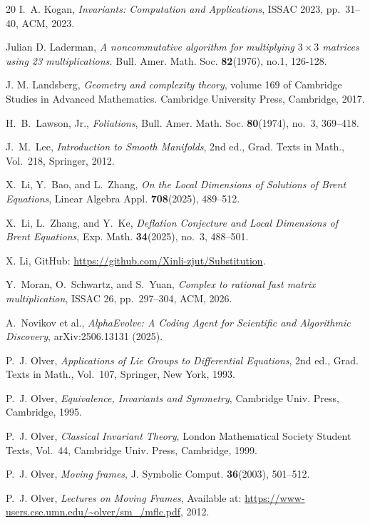 \documentclass[reqno]{amsart}
\theoremstyle{definition}
\numberwithin{equation}{section}
\theoremstyle{remark}
\begin{document}
\begin{thebibliography}{20}
I.~A. Kogan, \emph{Invariants: Computation and Applications}, ISSAC 2023, pp.~31--40, ACM, 2023.


Julian D. Laderman,
\emph{A noncommutative algorithm for multiplying $3\times3$ matrices using 23 multiplications.} Bull. Amer. Math. Soc. \textbf{82}(1976), no.1, 126-128.

J. M. Landsberg, \emph{Geometry and complexity theory}, volume 169 of Cambridge Studies in Advanced Mathematics. Cambridge University Press, Cambridge, 2017.

H.~B.~Lawson, Jr.,
\emph{Foliations},
Bull. Amer. Math. Soc. \textbf{80}(1974), no.~3, 369--418.


J.~M.~Lee,
\emph{Introduction to Smooth Manifolds},
2nd ed., Grad. Texts in Math., Vol.~218, Springer, 2012.

X.~Li, Y.~Bao, and L.~Zhang,
\emph{On the Local Dimensions of Solutions of Brent Equations},
Linear Algebra Appl. \textbf{708}(2025), 489--512.


X.~Li, L.~Zhang, and Y.~Ke,
\emph{Deflation Conjecture and Local Dimensions of Brent Equations},
Exp. Math. \textbf{34}(2025), no.~3, 488--501.

X. Li, GitHub: \url{https://github.com/Xinli-zjut/Substitution}.

Y.~Moran, O.~Schwartz, and S.~Yuan,
\emph{Complex to rational fast matrix multiplication},
ISSAC 26,  pp.~297--304, ACM, 2026.


A.~Novikov et al.,
\emph{AlphaEvolve: A Coding Agent for Scientific and Algorithmic Discovery},
arXiv:2506.13131 (2025).

P.~J. Olver,
\textit{Applications of Lie Groups to Differential Equations},
2nd ed., Grad. Texts in Math., Vol.~107, Springer, New York, 1993.

P.~J. Olver,
\textit{Equivalence, Invariants and Symmetry},
Cambridge Univ. Press, Cambridge, 1995.

P.~J. Olver,
\textit{Classical Invariant Theory},
London Mathematical Society Student Texts, Vol.~44,
Cambridge Univ. Press, Cambridge, 1999.

P.~J. Olver, \emph{Moving frames}, J. Symbolic Comput. \textbf{36}(2003), 501--512.

P.~J. Olver,
\emph{Lectures on Moving Frames},
Available at:
\url{https://www-users.cse.umn.edu/~olver/sm_/mflc.pdf}, 2012.




\end{thebibliography}
\end{document}
